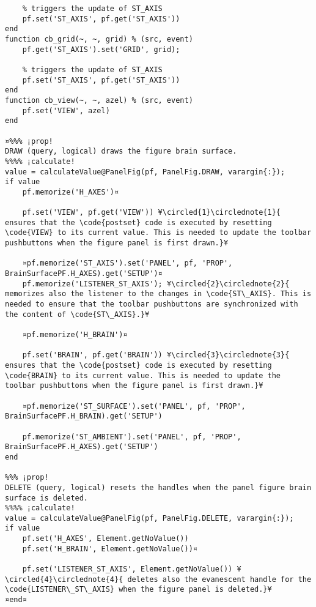\documentclass{tufte-handout}
\begin{document}
\begin{lstlisting}
    % triggers the update of ST_AXIS
    pf.set('ST_AXIS', pf.get('ST_AXIS'))
end
function cb_grid(~, ~, grid) % (src, event)
    pf.get('ST_AXIS').set('GRID', grid);

    % triggers the update of ST_AXIS
    pf.set('ST_AXIS', pf.get('ST_AXIS'))
end
function cb_view(~, ~, azel) % (src, event)
    pf.set('VIEW', azel)
end

¤%%% ¡prop!
DRAW (query, logical) draws the figure brain surface.
%%%% ¡calculate!
value = calculateValue@PanelFig(pf, PanelFig.DRAW, varargin{:});
if value
    pf.memorize('H_AXES')¤

    pf.set('VIEW', pf.get('VIEW')) ¥\circled{1}\circlednote{1}{ ensures that the \code{postset} code is executed by resetting \code{VIEW} to its current value. This is needed to update the toolbar pushbuttons when the figure panel is first drawn.}¥

    ¤pf.memorize('ST_AXIS').set('PANEL', pf, 'PROP', BrainSurfacePF.H_AXES).get('SETUP')¤
    pf.memorize('LISTENER_ST_AXIS'); ¥\circled{2}\circlednote{2}{ memorizes also the listener to the changes in \code{ST\_AXIS}. This is needed to ensure that the toolbar pushbuttons are synchronized with the content of \code{ST\_AXIS}.}¥
    
    ¤pf.memorize('H_BRAIN')¤

    pf.set('BRAIN', pf.get('BRAIN')) ¥\circled{3}\circlednote{3}{ ensures that the \code{postset} code is executed by resetting \code{BRAIN} to its current value. This is needed to update the toolbar pushbuttons when the figure panel is first drawn.}¥

    ¤pf.memorize('ST_SURFACE').set('PANEL', pf, 'PROP', BrainSurfacePF.H_BRAIN).get('SETUP')
    
    pf.memorize('ST_AMBIENT').set('PANEL', pf, 'PROP', BrainSurfacePF.H_AXES).get('SETUP')
end

%%% ¡prop!
DELETE (query, logical) resets the handles when the panel figure brain surface is deleted.
%%%% ¡calculate!
value = calculateValue@PanelFig(pf, PanelFig.DELETE, varargin{:});
if value
    pf.set('H_AXES', Element.getNoValue())
    pf.set('H_BRAIN', Element.getNoValue())¤

    pf.set('LISTENER_ST_AXIS', Element.getNoValue()) ¥\circled{4}\circlednote{4}{ deletes also the evanescent handle for the \code{LISTENER\_ST\_AXIS} when the figure panel is deleted.}¥
¤end¤
\end{lstlisting}
\end{document}
